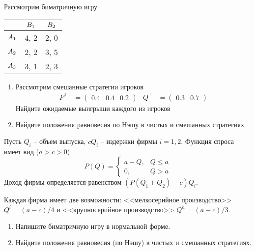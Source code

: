 \begin{exercise}
Рассмотрим биматричную игру
\begin{center}
	\begin{tabular}{|c||c|c|}
	\hline
	& $B_{1}$ & $B_{2}$  \\ \hline \hline
	$A_1$ & 4, 2 & 2, 0  \\ \hline
	$A_2$ & 2, 2 & 3, 5  \\ \hline
	$A_3$ & 3, 1 & 2, 3 \\ 
	\hline
	\end{tabular}
\end{center}
\begin{enumerate}
	\item Рассмотрим смешанные стратегии игроков 
	\begin{align*}
		P^\top&=\begin{pmatrix} 0.4 & 0.4 & 0.2 \end{pmatrix} &
		Q^\top&=\begin{pmatrix} 0.3 & 0.7 \end{pmatrix}
	\end{align*}
	Найдите ожидаемые выигрыши каждого из игроков
	\item Найдите положения равновесия по Нэшу в чистых и смешанных стратегиях
\end{enumerate}
\end{exercise}


\begin{exercise}
Пусть $Q_i$ -- объем выпуска, $cQ_i$ --
издержки фирмы $i=1,2$. Функция спроса имеет вид ($a>c>0$)
\[
	P(Q)=\begin{cases}
	a-Q, & Q\leq a \\
	0, & Q>a
	\end{cases}
\]
Доход фирмы определяется равенством $(P(Q_1+Q_2)-c)Q_i$.

Каждая фирма имеет две возможности: <<мелкосерийное производство>>
$Q^l=(a-c)/4$ и <<крупносерийное производство>> $Q^h=(a-c)/3$.
\begin{enumerate}
	\item Напишите биматричную игру в нормальной форме.
	\item Найдите положения равновесия (по Нэшу) в чистых и смешанных
	стратегиях.
\end{enumerate}
\end{exercise}

